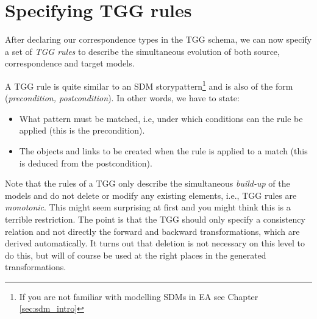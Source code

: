 \section{Specifying TGG rules}

After declaring our correspondence types in the TGG schema, we can now specify a set of \emph{TGG rules} to describe the simultaneous evolution of both source, correspondence and target models.

A TGG rule is quite similar to an SDM storypattern\footnote{If you are not familiar with modelling SDMs in EA see Chapter \ref{sec:sdm_intro}} and is also of the form (\emph{precondition, postcondition}).
In other words, we have to state:
\begin{itemize}
  \item What pattern must be matched, i.e, under which conditions can the rule be applied (this is the precondition).
  \item The objects and links to be created when the rule is applied to a match (this is deduced from the postcondition).
\end{itemize}

Note that the rules of a TGG only describe the simultaneous \emph{build-up} of the models and do not delete or modify any existing elements, i.e., TGG rules are \emph{monotonic}.
This might seem surprising at first and you might think this is a terrible restriction.
The point is that the TGG should only specify a consistency relation and not directly the forward and backward transformations, which are derived automatically.
It turns out that deletion is not necessary on this level to do this, but will of course be used at the right places in the generated transformations.

